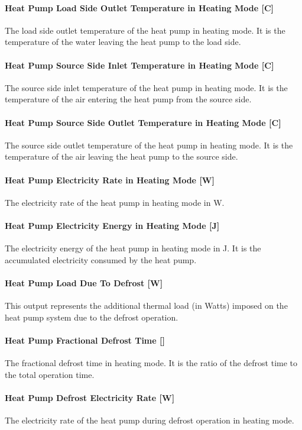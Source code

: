 \paragraph{Heat Pump Load Side Outlet Temperature in Heating Mode {[}C{]}} The
load side outlet temperature of the heat pump in heating mode. It is the
temperature of the water leaving the heat pump to the load side.
\paragraph{Heat Pump Source Side Inlet Temperature in Heating Mode {[}C{]}} The
source side inlet temperature of the heat pump in heating mode. It is the
temperature of the air entering the heat pump from the source side.
\paragraph{Heat Pump Source Side Outlet Temperature in Heating Mode {[}C{]}} The
source side outlet temperature of the heat pump in heating mode. It is the
temperature of the air leaving the heat pump to the source side.
\paragraph{Heat Pump Electricity Rate in Heating Mode {[}W{]}} The electricity
rate of the heat pump in heating mode in W.
\paragraph{Heat Pump Electricity Energy in Heating Mode {[}J{]}} The electricity
energy of the heat pump in heating mode in J. It is the accumulated electricity
consumed by the heat pump.
\paragraph{Heat Pump Load Due To Defrost {[}W{]}} 
This output represents the additional thermal load (in Watts) imposed on the heat pump 
system due to the defrost operation.
\paragraph{Heat Pump Fractional Defrost Time {[}{]}} The fractional defrost
time in heating mode. It is the ratio of the defrost time to the total operation
time.
\paragraph{Heat Pump Defrost Electricity Rate {[}W{]}} The electricity rate of
the heat pump during defrost operation in heating mode.
